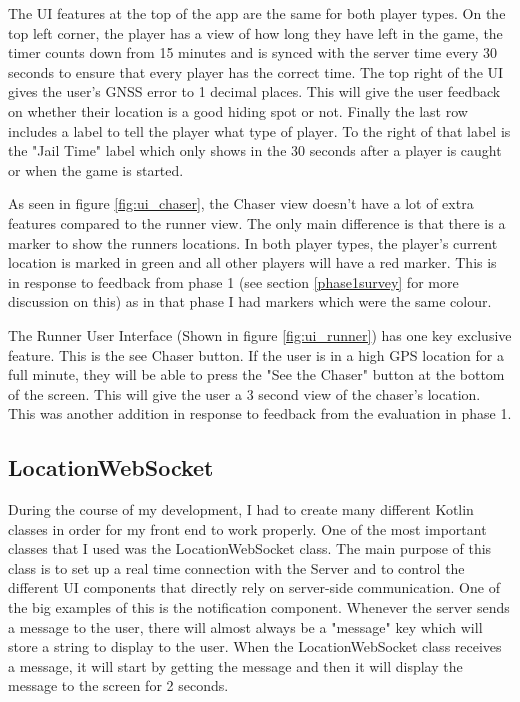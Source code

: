 \documentclass{l4proj}
\begin{document}
The UI features at the top of the app are the same for both player types. On the top
left corner, the player has a view of how long they have left in the game, the timer
counts down from 15 minutes and is synced with the server time every 30 seconds to 
ensure that every player has the correct time. The top right of the UI gives the
user's GNSS error to 1 decimal places. This will give the user feedback on whether
their location is a good hiding spot or not. Finally the last row includes a label
to tell the player what type of player. To the right of that label is the "Jail Time"
label which only shows in the 30 seconds after a player is caught or when the game is
started.

As seen in figure \ref{fig:ui_chaser}, the Chaser view doesn't have a lot of extra features
compared to the runner view. The only main difference is that there is a marker to show the
runners locations. In both player types, the player's current location is marked in green and
all other players will have a red marker. This is in response to feedback from phase 1 (see section
\ref{phase1survey} for more discussion on this) as in that phase I had markers which were the same
colour.

The Runner User Interface (Shown in figure \ref{fig:ui_runner}) has one key exclusive feature. This is the see Chaser button. If the user
is in a high GPS location for a full minute, they will be able to press the "See the Chaser" button
at the bottom of the screen. This will give the user a 3 second view of the chaser's location. This
was another addition in response to feedback from the evaluation in phase 1.

\subsection{LocationWebSocket}
During the course of my development, I had to create many different Kotlin classes in order for my front end to work properly.
One of the most important classes that I used was the LocationWebSocket class. The main purpose of this class is to set up a
real time connection with the Server and to control the different UI components that directly rely on server-side communication.
One of the big examples of this is the notification component. Whenever the server sends a message to the user, there will almost
always be a "message" key which will store a string to display to the user. When the LocationWebSocket class receives a message, it 
will start by getting the message and then it will display the message to the screen for 2 seconds.
\end{document}
